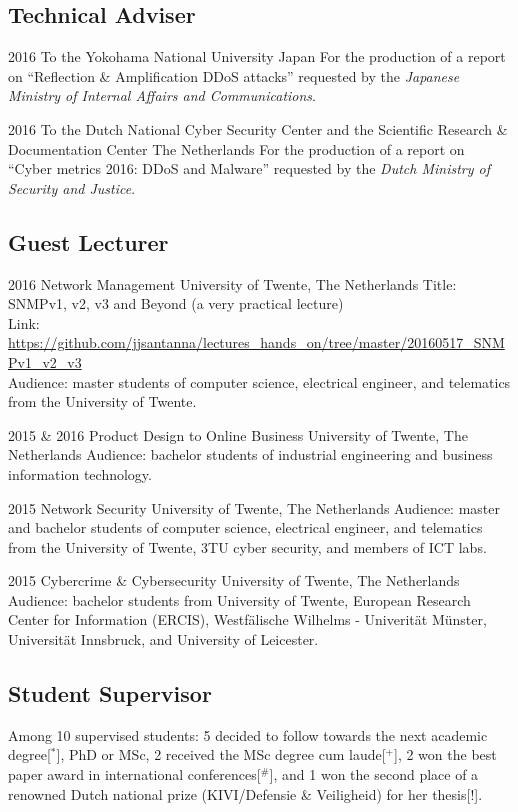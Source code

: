 \documentclass[print]{friggeri-cv-linux} %
\begin{document}
\subsection{Technical Adviser}
\begin{entrylist}
\entry
{2016}
{To the Yokohama National University}
{Japan}
{For the production of a report on ``Reflection \& Amplification DDoS attacks'' requested by the \emph{Japanese Ministry of Internal Affairs and Communications}.}

\entry
{2016}
{To the Dutch National Cyber Security Center and the Scientific Research \& Documentation Center}
{The Netherlands}
{For the production of a report on ``Cyber metrics 2016: DDoS and Malware'' requested by the \emph{Dutch Ministry of Security and Justice}.}
\end{entrylist}



\newpage
\subsection{Guest Lecturer}
\begin{entrylist}
\entry
{2016}
{Network Management}
{University of Twente, The Netherlands}
{Title: SNMPv1, v2, v3 and Beyond (a very practical lecture)\\
Link: \url{https://github.com/jjsantanna/lectures_hands_on/tree/master/20160517_SNMPv1_v2_v3}\\
Audience: master students of computer science, electrical engineer, and telematics from the University of Twente. }

\entry
{2015 \& 2016}
{Product Design to Online Business}
{University of Twente, The Netherlands}
{Audience: bachelor students of industrial engineering and business information technology.}

\entry
{2015}
{Network Security}
{University of Twente, The Netherlands}
{Audience: master and bachelor students of computer science, electrical engineer, and telematics from the University of Twente, 3TU cyber security, and members of ICT labs. }

\entry
{2015}
{Cybercrime \& Cybersecurity}
{University of Twente, The Netherlands}
{Audience: bachelor students from University of Twente, European Research Center for Information (ERCIS), Westfälische Wilhelms - Univerität Münster, Universität Innsbruck, and University of Leicester. }
\end{entrylist}

\subsection{Student Supervisor}
Among 10 supervised students: 5 decided to follow towards the next academic degree[$^*$], PhD or MSc, 2 received the MSc degree cum laude[$^+$], 2 won the best paper award in international conferences[$^\#$], and 1 won the second place of a renowned Dutch national prize (KIVI/Defensie \& Veiligheid) for her thesis[$!$].
\end{document}
